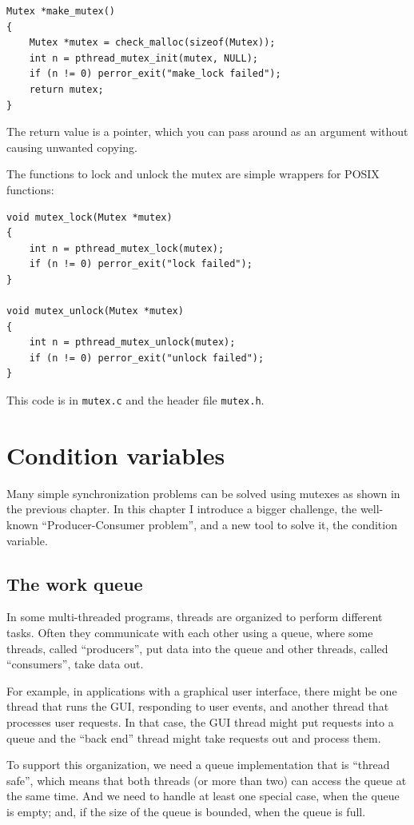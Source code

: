 \documentclass[12pt]{book}
\begin{document}
\begin{verbatim}
Mutex *make_mutex()
{
    Mutex *mutex = check_malloc(sizeof(Mutex));
    int n = pthread_mutex_init(mutex, NULL);
    if (n != 0) perror_exit("make_lock failed"); 
    return mutex;
}
\end{verbatim}

The return value is a pointer, which you can pass around as an
argument without causing unwanted copying.

The functions to lock and unlock the mutex are simple wrappers
for POSIX functions:

\begin{verbatim}
void mutex_lock(Mutex *mutex)
{
    int n = pthread_mutex_lock(mutex);
    if (n != 0) perror_exit("lock failed");
}

void mutex_unlock(Mutex *mutex)
{
    int n = pthread_mutex_unlock(mutex);
    if (n != 0) perror_exit("unlock failed");
}
\end{verbatim}

This code is in {\tt mutex.c} and the header file {\tt mutex.h}.


\chapter{Condition variables}
\label{csem}

Many simple synchronization problems can be solved using mutexes
as shown in the previous chapter.  In this chapter I introduce a
bigger challenge, the well-known ``Producer-Consumer problem'', and
a new tool to solve it, the condition variable.

\section{The work queue}
\label{queue}

In some multi-threaded programs, threads are organized to perform
different tasks.  Often they communicate with each other using a queue,
where some threads, called ``producers'', put data into the queue
and other threads, called ``consumers'', take data out.

For example, in applications with a graphical user interface, there
might be one thread that runs the GUI, responding to user events,
and another thread that processes user requests.  In that case,
the GUI thread might put requests into a queue and the ``back end''
thread might take requests out and process them.

To support this organization, we need a queue implementation that
is ``thread safe'', which means that both threads (or more than two)
can access the queue at the same time.  And we need to handle at least
one special case, when the queue is empty; and, if the size of the
queue is bounded, when the queue is full.
\end{document}
